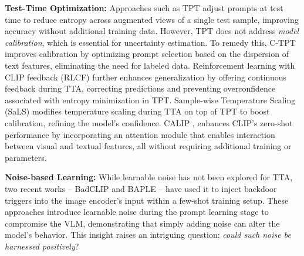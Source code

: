 \vspace{0.2cm}
\noindent\textbf{Test-Time Optimization:}
Approaches such as TPT \cite{shu2022test} adjust prompts at test time to reduce entropy across augmented views of a single test sample, improving accuracy without additional training data. However, TPT does not address \textit{model calibration}, which is essential for uncertainty estimation.
To remedy this, C-TPT \cite{yooncctpt} improves calibration by optimizing prompt selection based on the dispersion of text features, eliminating the need for labeled data. Reinforcement learning with CLIP feedback (RLCF) \cite{zhaotestrlcf} further enhances generalization by offering continuous feedback during TTA, correcting predictions and preventing overconfidence associated with entropy minimization in TPT. Sample-wise Temperature Scaling (SaLS) \cite{murugesan2024robust} modifies temperature scaling during TTA on top of TPT to boost calibration, refining the model’s confidence. CALIP \cite{guo2023calip}, enhances CLIP’s zero-shot performance by incorporating an attention module that enables interaction between visual and textual features, all without requiring additional training or parameters.

\vspace{0.2cm}
\noindent\textbf{Noise-based Learning:} 
While learnable noise has not been explored for TTA, two recent works -- BadCLIP \cite{bai2024badclip} and BAPLE \cite{hanif2024baple} -- have used it to inject backdoor triggers into the image encoder's input within a few-shot training setup. These approaches introduce learnable noise during the prompt learning stage to compromise the VLM, demonstrating that simply adding noise can alter the model's behavior. This insight raises an intriguing question: \textit{could such noise be harnessed positively}?

